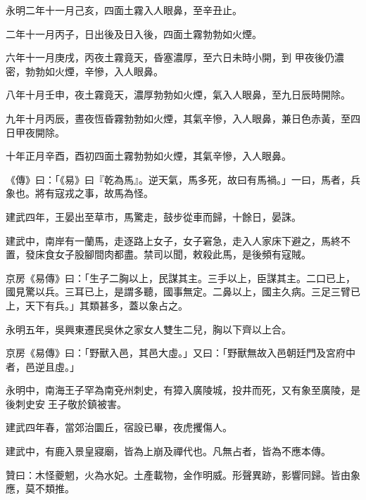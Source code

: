 \begin{pinyinscope}
 永明二年十一月己亥，四面土霧入人眼鼻，至辛丑止。



 二年十一月丙子，日出後及日入後，四面土霧勃勃如火煙。



 六年十一月庚戌，丙夜土霧竟天，昏塞濃厚，至六日未時小開，到
 甲夜後仍濃密，勃勃如火煙，辛慘，入人眼鼻。



 八年十月壬申，夜土霧竟天，濃厚勃勃如火煙，氣入人眼鼻，至九日辰時開除。



 九年十月丙辰，晝夜恆昏霧勃勃如火煙，其氣辛慘，入人眼鼻，兼日色赤黃，至四日甲夜開除。



 十年正月辛酉，酉初四面土霧勃勃如火煙，其氣辛慘，入人眼鼻。



 《傳》曰：「《易》曰『乾為馬』。逆天氣，馬多死，故曰有馬禍。」一曰，馬者，兵象也。將有寇戎之事，故馬為怪。



 建武四年，王晏出至草市，馬驚走，鼓步從車而歸，十餘日，晏誅。



 建武中，南岸有一蘭馬，走逐路上女子，女子窘急，走入人家床下避之，馬終不置，發床食女子股腳間肉都盡。禁司以聞，敕殺此馬，是後頻有寇賊。



 京房《易傳》曰：「生子二胸以上，民謀其主。三手以上，臣謀其主。二口已上，國見驚以兵。三耳已上，是謂多聽，國事無定。二鼻以上，國主久病。三足三臂已上，天下有兵。」其類甚多，蓋以象占之。



 永明五年，吳興東遷民吳休之家女人雙生二兒，胸以下齊以上合。



 京房《易傳》曰：「野獸入邑，其邑大虛。」又曰：「野獸無故入邑朝廷門及宮府中者，邑逆且虛。」



 永明中，南海王子罕為南兗州刺史，有獐入廣陵城，投井而死，又有象至廣陵，是後刺史安王子敬於鎮被害。



 建武四年春，當郊治圜丘，宿設已畢，夜虎攫傷人。



 建武中，有鹿入景皇寢廟，皆為上崩及禪代也。凡無占者，皆為不應本傳。



 贊曰：木怪夔魍，火為水妃。土產載物，金作明威。形聲異跡，影響同歸。皆由象應，莫不類推。



\end{pinyinscope}